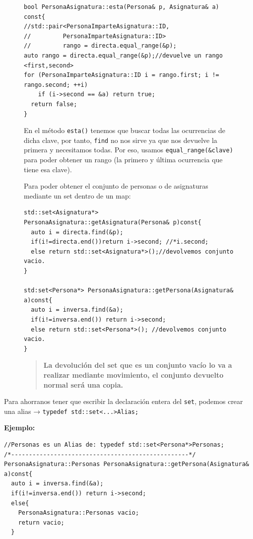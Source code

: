 \begin{figure}[h]
  \begin{center}
    \begin{lstlisting}[frame=single]
bool PersonaAsignatura::esta(Persona& p, Asignatura& a) const{ 
//std::pair<PersonaImparteAsignatura::ID,
//         PersonaImparteAsignatura::ID>
//         rango = directa.equal_range(&p);
auto rango = directa.equal_range(&p);//devuelve un rango <first,second>
for (PersonaImparteAsignatura::ID i = rango.first; i != rango.second; ++i)
    if (i->second == &a) return true;
  return false;
}
  \end{lstlisting}
  \end{center}
En el método \texttt {esta()} tenemos que buscar todas las ocurrencias de dicha clave, por tanto, \texttt{find} no nos sirve ya que nos devuelve la primera y necesitamos todas. Por eso, usamos \texttt{equal\_range(\&clave)}
 para poder obtener un rango (la primero y última ocurrencia que tiene esa clave).

Para poder obtener el conjunto de personas o de asignaturas mediante un set dentro de un map:
\end{figure}
\begin{figure}[h]
  \begin{center}
    \begin{lstlisting}[frame=single]
std::set<Asignatura*> PersonaAsignatura::getAsignatura(Persona& p)const{
  auto i = directa.find(&p);
  if(i!=directa.end())return i->second; //*i.second;
  else return std::set<Asignatura*>();//devolvemos conjunto vacio.
}

std:set<Persona*> PersonaAsignatura::getPersona(Asignatura& a)const{
  auto i = inversa.find(&a);
  if(i!=inversa.end()) return i->second;
  else return std::set<Persona*>(); //devolvemos conjunto vacio.
}
  \end{lstlisting}
  \end{center}
  \begin{quote}
    \textbf{La devolución del set que es un conjunto vacío lo va a realizar mediante movimiento, el conjunto devuelto normal será una copia.}
  \end{quote}
\end{figure}

Para ahorranos tener que escribir la declaración entera del \texttt{set}, podemos crear una alias → \texttt{typedef std::set<...>Alias;}

\textbf{\large{Ejemplo:}}
\begin{center}
	\begin{lstlisting}[frame=single]
//Personas es un Alias de: typedef std::set<Persona*>Personas;
/*--------------------------------------------------*/
PersonaAsignatura::Personas PersonaAsignatura::getPersona(Asignatura& a)const{
  auto i = inversa.find(&a);
  if(i!=inversa.end()) return i->second;
  else{
    PersonaAsignatura::Personas vacio;
    return vacio;
  }
	\end{lstlisting}
\end{center}

